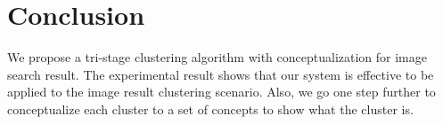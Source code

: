 \section{Conclusion}
We propose a tri-stage clustering algorithm with conceptualization for image search result.
The experimental result shows that our system is effective to be applied
to the image result clustering scenario. Also, we go one step further to conceptualize each
cluster to a set of concepts to show what the cluster is.
